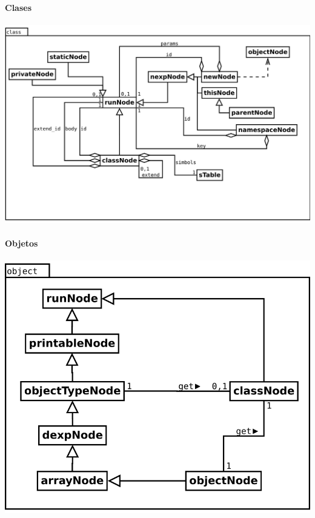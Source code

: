 \paragraph {Clases}
\begin{center}
\includegraphics[scale=0.4]{class.png} \\
\end{center}

\paragraph {Objetos}
\begin{center}
\includegraphics[scale=0.4]{object.png} \\
\end{center}

